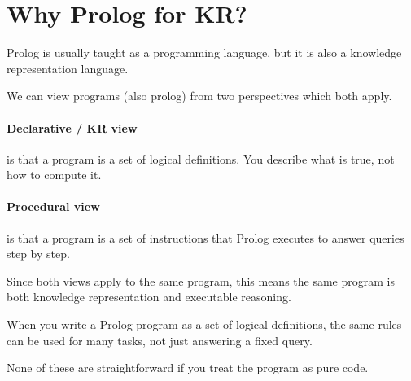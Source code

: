 

\section{Why Prolog for KR?}
Prolog is usually taught as a programming language, but it is also a knowledge representation language.

We can view programs (also prolog) from two perspectives which both apply.

\paragraph{Declarative / KR view} is that a program is a set of logical definitions. You describe
what is true, not how to compute it.

\paragraph{Procedural view} is that a program is a set of instructions that Prolog executes to
answer queries step by step.

Since both views apply to the same program, this means the same program is both
knowledge representation and executable reasoning.


When you write a Prolog program as a set of logical definitions, the same rules can be
used for many tasks, not just answering a fixed query.



None of these are straightforward if you treat the program as pure code.

